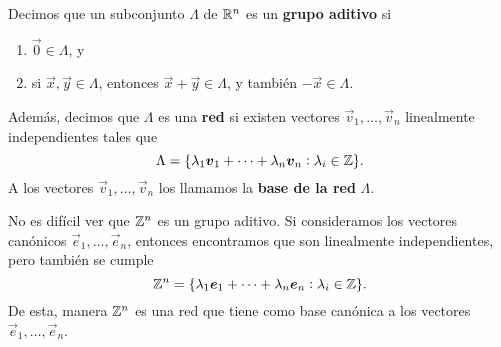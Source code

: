 \begin{definition}
	Decimos que un subconjunto $\Lambda$ de $\mathbb{R}^n$ es un \textbf{grupo aditivo} si
	\begin{enumerate}
		\item $\vec{0} \in \Lambda$, y
		\item si $\vec{x}, \vec{y} \in \Lambda$, entonces $\vec{x} + \vec{y} \in \Lambda$, y también
			$-\vec{x} \in \Lambda$.
	\end{enumerate}
	Además, decimos que $\Lambda$ es una \textbf{red} si existen vectores $\vec{v}_1, \ldots, \vec{v}_n$
	linealmente independientes tales que
	\begin{equation*}
		\Lambda = \lbrace \lambda_1\boldsymbol{v}_1 + \cdots + \lambda_n\boldsymbol{v}_n \vcentcolon \lambda_i \in
		\mathbb{Z} \rbrace.
	\end{equation*}
	A los vectores $\vec{v}_1, \ldots, \vec{v}_n$ los llamamos la \textbf{base de la red} $\Lambda$.
\end{definition}

\begin{example}
	No es difícil ver que $\mathbb{Z}^n$ es un grupo aditivo. Si consideramos los vectores canónicos
	$\vec{e}_1, \ldots, \vec{e}_n$, entonces encontramos que son linealmente independientes, pero
	también se cumple
	\begin{equation*}
		\mathbb{Z}^n = \lbrace \lambda_1\boldsymbol{e}_1 + \cdots + \lambda_n\boldsymbol{e}_n \vcentcolon \lambda_i \in
		\mathbb{Z} \rbrace.
	\end{equation*}
	De esta, manera $\mathbb{Z}^n$ es una red que tiene como base canónica a los vectores $\vec{e}_1,
	\ldots, \vec{e}_n$.
\end{example}

